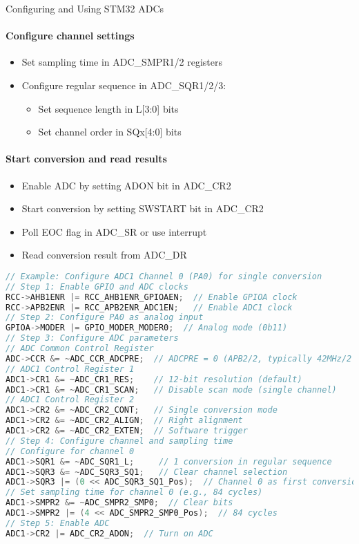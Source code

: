 \begin{KR}{Configuring and Using STM32 ADCs}
\paragraph{Configure channel settings}
\begin{itemize}
    \item Set sampling time in ADC\_SMPR1/2 registers
    \item Configure regular sequence in ADC\_SQR1/2/3:
    \begin{itemize}
        \item Set sequence length in L[3:0] bits
        \item Set channel order in SQx[4:0] bits
    \end{itemize}
\end{itemize}

\paragraph{Start conversion and read results}
\begin{itemize}
    \item Enable ADC by setting ADON bit in ADC\_CR2
    \item Start conversion by setting SWSTART bit in ADC\_CR2
    \item Poll EOC flag in ADC\_SR or use interrupt
    \item Read conversion result from ADC\_DR
\end{itemize}

\begin{lstlisting}[language=C, style=basesmol]
// Example: Configure ADC1 Channel 0 (PA0) for single conversion
// Step 1: Enable GPIO and ADC clocks
RCC->AHB1ENR |= RCC_AHB1ENR_GPIOAEN;  // Enable GPIOA clock
RCC->APB2ENR |= RCC_APB2ENR_ADC1EN;   // Enable ADC1 clock
// Step 2: Configure PA0 as analog input
GPIOA->MODER |= GPIO_MODER_MODER0;  // Analog mode (0b11)
// Step 3: Configure ADC parameters
// ADC Common Control Register
ADC->CCR &= ~ADC_CCR_ADCPRE;  // ADCPRE = 0 (APB2/2, typically 42MHz/2 = 21MHz)
// ADC1 Control Register 1
ADC1->CR1 &= ~ADC_CR1_RES;    // 12-bit resolution (default)
ADC1->CR1 &= ~ADC_CR1_SCAN;   // Disable scan mode (single channel)
// ADC1 Control Register 2
ADC1->CR2 &= ~ADC_CR2_CONT;   // Single conversion mode
ADC1->CR2 &= ~ADC_CR2_ALIGN;  // Right alignment
ADC1->CR2 &= ~ADC_CR2_EXTEN;  // Software trigger
// Step 4: Configure channel and sampling time
// Configure for channel 0
ADC1->SQR1 &= ~ADC_SQR1_L;     // 1 conversion in regular sequence
ADC1->SQR3 &= ~ADC_SQR3_SQ1;   // Clear channel selection
ADC1->SQR3 |= (0 << ADC_SQR3_SQ1_Pos);  // Channel 0 as first conversion
// Set sampling time for channel 0 (e.g., 84 cycles)
ADC1->SMPR2 &= ~ADC_SMPR2_SMP0;  // Clear bits
ADC1->SMPR2 |= (4 << ADC_SMPR2_SMP0_Pos);  // 84 cycles
// Step 5: Enable ADC
ADC1->CR2 |= ADC_CR2_ADON;  // Turn on ADC
\end{lstlisting}
\end{KR}







